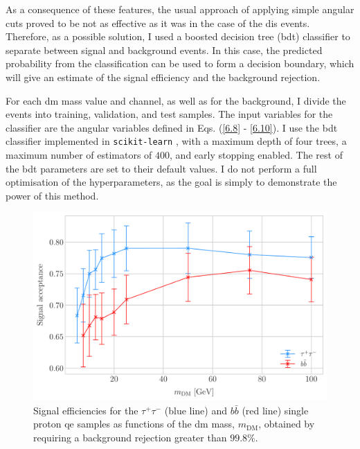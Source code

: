 As a consequence of these features, the usual approach of applying simple angular cuts proved to be not as effective as it was in the case of the \gls{dis} events. Therefore, as a possible solution, I used a boosted decision tree (\gls{bdt}) classifier to separate between signal and background events. In this case, the predicted probability from the classification can be used to form a decision boundary, which will give an estimate of the signal efficiency and the background rejection.

For each \gls{dm} mass value and channel, as well as for the background, I divide the events into training, validation, and test samples. The input variables for the classifier are the angular variables defined in Eqs. (\ref{6.8} - \ref{6.10}). I use the \gls{bdt} classifier implemented in \texttt{scikit-learn} \cite{scikit-learn}, with a maximum depth of four trees, a maximum number of estimators of $400$, and early stopping enabled. The rest of the \gls{bdt} parameters are set to their default values. I do not perform a full optimisation of the hyperparameters, as the goal is simply to demonstrate the power of this method.

\begin{figure}[t]
	\centering
	\includegraphics[width=0.9\linewidth]{Images/DM_Analysis/solardm_qel_signal_acceptance_new.pdf}
	\caption[Signal efficiencies for the $\tau^{+} \tau^{-}$ and $b\bar{b}$ single proton \gls{qe} samples as functions of the \gls{dm} mass.]{Signal efficiencies for the $\tau^{+} \tau^{-}$ (blue line) and $b\bar{b}$ (red line) single proton \gls{qe} samples as functions of the \gls{dm} mass, $m_{\mathrm{DM}}$, obtained by requiring a background rejection greater than $99.8\%$.}
	\label{fig:solardm_qel_signal_acceptance}
\end{figure}

